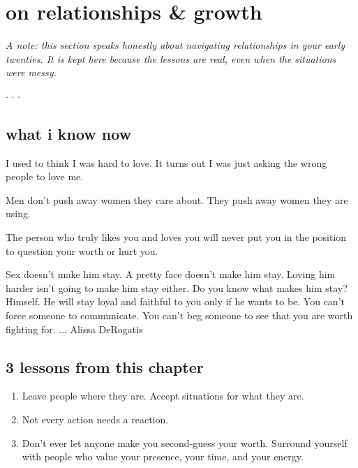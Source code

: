 \documentclass[12pt, letterpaper]{article}
\newenvironment{jadequote}{%
  \begin{mdframed}[backgroundcolor=soft, linecolor=moxie, linewidth=1pt,
    innerleftmargin=10pt, innerrightmargin=10pt,
    innertopmargin=8pt, innerbottommargin=8pt]
  \itshape
}{%
  \end{mdframed}
}
\newcommand{\softbreak}{%
  \begin{center}
    \textcolor{moxie}{\small $\cdot$ \quad $\cdot$ \quad $\cdot$}
  \end{center}
}
\begin{document}
\section{on relationships \& growth}

\textit{A note: this section speaks honestly about navigating relationships in your early twenties. It is kept here because the lessons are real, even when the situations were messy.}

\softbreak

\subsection{what i know now}

\begin{jadequote}
I used to think I was hard to love. It turns out I was just asking the wrong people to love me.
\end{jadequote}

\begin{jadequote}
Men don't push away women they care about. They push away women they are using.
\end{jadequote}

\begin{jadequote}
The person who truly likes you and loves you will never put you in the position to question your worth or hurt you.
\end{jadequote}

\begin{jadequote}
Sex doesn't make him stay. A pretty face doesn't make him stay. Loving him harder isn't going to make him stay either. Do you know what makes him stay? Himself. He will stay loyal and faithful to you only if he wants to be. You can't force someone to communicate. You can't beg someone to see that you are worth fighting for. ... Alissa DeRogatis
\end{jadequote}

\subsection{3 lessons from this chapter}
\begin{enumerate}[leftmargin=*, label=\arabic*.]
  \item Leave people where they are. Accept situations for what they are.
  \item Not every action needs a reaction.
  \item Don't ever let anyone make you second-guess your worth. Surround yourself with people who value your presence, your time, and your energy.
\end{enumerate}
\end{document}
